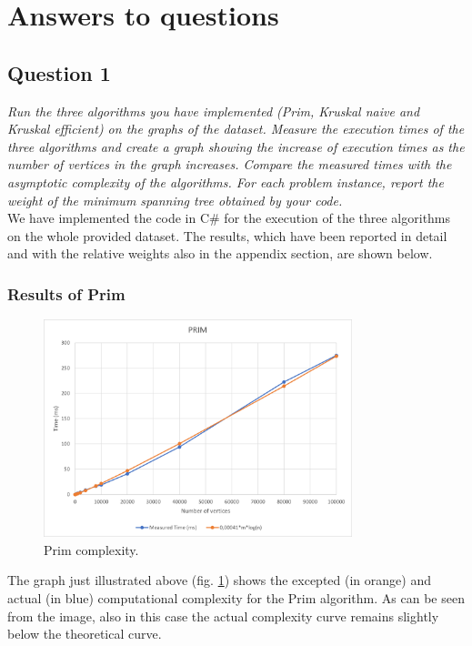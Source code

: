 \section{Answers to questions}

\subsection{Question 1}
\textit{Run the three algorithms you have implemented (Prim, Kruskal naive and Kruskal efficient) on the graphs of the dataset. Measure the execution times of the three algorithms and create a graph showing the increase of execution times as the number of vertices in the graph increases. Compare the measured times with the asymptotic complexity of the algorithms. For each problem instance, report the weight of the minimum spanning tree obtained by your code.} \\

\noindent
We have implemented the code in C\# for the execution of the three algorithms on the whole provided dataset. The results, which have been reported in detail and with the relative weights also in the appendix section, are shown below.

\subsubsection{Results of Prim}
\begin{figure}[H]
    \centering
    \includegraphics[width=0.8\textwidth]{../img/Prim.png}
    \caption{Prim complexity.}
    \label{fig:prim}
\end{figure}
The graph just illustrated above (fig. \ref{fig:prim}) shows the excepted (in orange) and actual (in blue) computational complexity for the Prim algorithm. As can be seen from the image, also in this case the actual complexity curve remains slightly below the theoretical curve.

